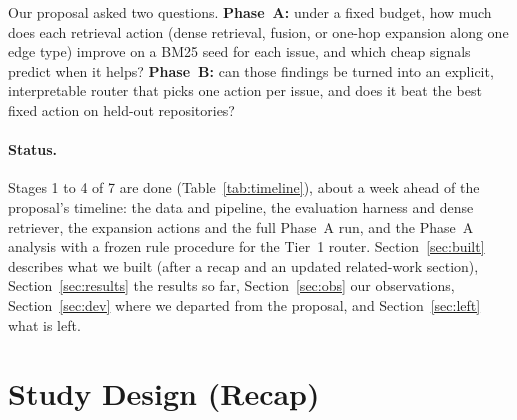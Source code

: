 \documentclass[11pt]{article}
\begin{document}
Our proposal asked two questions. \textbf{Phase~A:} under a fixed budget, how
much does each retrieval action (dense retrieval, fusion, or one-hop expansion
along one edge type) improve on a BM25 seed for each issue, and which cheap
signals predict when it helps? \textbf{Phase~B:} can those findings be turned
into an explicit, interpretable router that picks one action per issue, and
does it beat the best fixed action on held-out repositories?

\paragraph{Status.} Stages 1 to 4 of 7 are done (Table~\ref{tab:timeline}),
about a week ahead of the proposal's timeline: the data and pipeline, the
evaluation harness and dense retriever, the expansion actions and the full
Phase~A run, and the Phase~A analysis with a frozen rule procedure for the
Tier~1 router. Section~\ref{sec:built} describes what we built (after a recap and an
updated related-work section),
Section~\ref{sec:results} the results so far, Section~\ref{sec:obs} our
observations, Section~\ref{sec:dev} where we departed from the proposal, and
Section~\ref{sec:left} what is left.

\section{Study Design (Recap)}
\end{document}
